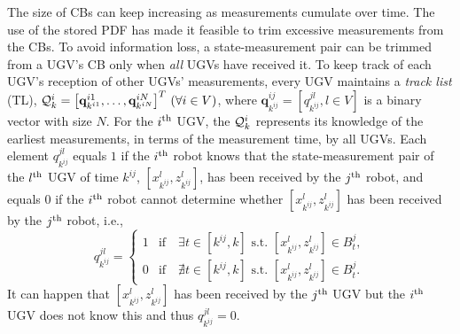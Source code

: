 	
	The size of CBs can keep increasing as measurements cumulate over time. 
	The use of the stored PDF has made it feasible to trim excessive measurements from the CBs.
	To avoid information loss, a state-measurement pair can be trimmed from a UGV's CB only when \textit{all} UGVs have received it.
	To keep track of each UGV's reception of other UGVs' measurements, every UGV maintains a \textit{track list} (TL), $\mathcal{Q}^i_k=\left[\mathbf{q}^{i1}_{k^{i1}},\dots, \mathbf{q}^{iN}_{k^{iN}}\right]^T \,(\forall i\in V)$, where $\mathbf{q}^{ij}_{k^{ij}}=\left[q^{jl}_{k^{ij}}, l\in V\right]$ is a binary vector with size $N$.
	For the $i^\text{th}$ UGV, the $\mathcal{Q}^i_k$ represents its knowledge of the earliest measurements, in terms of the measurement time, by all UGVs.	
	Each element $q^{jl}_{k^{ij}}$ equals $1$ if the $i^\text{th}$ robot knows that the state-measurement pair of the $l^\text{th}$ UGV of time $k^{ij}$, $\left[x^l_{k^{ij}},z^l_{k^{ij}}\right]$, has been received by the $j^\text{th}$ robot, and equals $0$ if the $i^\text{th}$ robot cannot determine whether $\left[x^l_{k^{ij}},z^l_{k^{ij}}\right]$ has been received by the $j^\text{th}$ robot, i.e.,
	\begin{equation*}
	q^{jl}_{k^{ij}}=
	\begin{cases}
	1 & \text{if}\quad \exists t\in\left[k^{ij}, k\right] \text{ s.t. } \left[x^l_{k^{ij}},z^l_{k^{ij}}\right]\in B^j_t,\\
	0 & \text{if}\quad \nexists t\in\left[k^{ij}, k\right] \text{ s.t. } \left[x^l_{k^{ij}},z^l_{k^{ij}}\right]\in B^j_t.
	\end{cases}
	\end{equation*}
	It can happen that $\left[x^l_{k^{ij}},z^l_{k^{ij}}\right]$ has been received by the $j^\text{th}$ UGV but the $i^\text{th}$ UGV does not know this and thus $q^{jl}_{k^{ij}}=0$.
	
